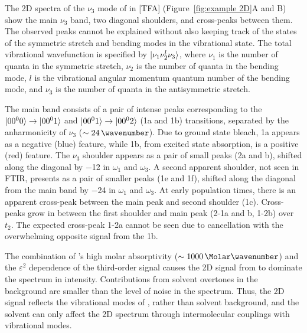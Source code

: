 \documentclass[%
  class = book,%
  crop = false,%
  float = true,%
  multi = true,%
  preview = false,%
]{standalone}
\begin{document}
{The 2D spectra of the \(\nu_3\) mode of  in \ce{[Im_{4,1}]}[TFA] (Figure~\ref{fig:example 2D}A and B) show the main \(\nu_3\) band, two diagonal shoulders, and cross-peaks between them. The observed peaks cannot be explained without also keeping track of the states of the  symmetric stretch and bending modes in the vibrational state. The total vibrational wavefunction is specified by \(\ket{\nu_1 \nu_2^l \nu_3}\), where \(\nu_1\) is the number of quanta in the symmetric stretch, \(\nu_2\) is the number of quanta in the bending mode, \(l\) is the vibrational angular momentum quantum number of the bending mode, and \(\nu_3\) is the number of quanta in the antisymmetric stretch.

The main band consists of a pair of intense peaks corresponding to the \(\ket{00^00} \rightarrow \ket{00^01}\) and \(\ket{00^01} \rightarrow \ket{00^02}\) (1a and 1b) transitions, separated by the anharmonicity of \(\nu_3\) (\(\sim \SI{24}{\wavenumber}\)). Due to ground state bleach, 1a appears as a negative (blue) feature, while 1b, from excited state absorption, is a positive (red) feature. The \(\nu_3\) shoulder appears as a pair of small peaks (2a and b), shifted along the diagonal by \SI{-12}{\wavenumber} in \(\omega_1\) and \(\omega_3\). A second apparent shoulder, not seen in FTIR, presents as a pair of smaller peaks (1e and 1f), shifted along the diagonal from the main band by \SI{-24}{\wavenumber} in \(\omega_1\) and \(\omega_3\). At early population times, there is an apparent cross-peak between the main peak and second shoulder (1c). Cross-peaks grow in between the first shoulder and main peak (2-1a and b, 1-2b) over \(t_2\). The expected cross-peak 1-2a cannot be seen due to cancellation with the overwhelming opposite signal from the 1b.

The combination of 's high molar absorptivity (\(\sim \SI{1000}{\per\Molar\wavenumber}\)) and the \(\varepsilon^2\) dependence of the third-order signal causes the 2D signal from  to dominate the spectrum in intensity. Contributions from solvent overtones in the background are smaller than the level of noise in the spectrum. Thus, the 2D signal reflects the vibrational modes of , rather than solvent background, and the solvent can only affect the 2D spectrum through intermolecular couplings with  vibrational modes.

}
\end{document}
